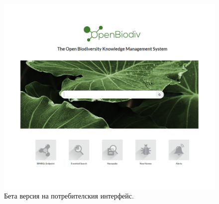 \begin{figure}
\centering
\includegraphics[width=\textwidth]{Figures/openbiodiv-webpage}
\decoRule
\caption[OpenBiodiv Website]{Бета версия на потребителския интерфейс.}
\label{fig:website}
\end{figure}


